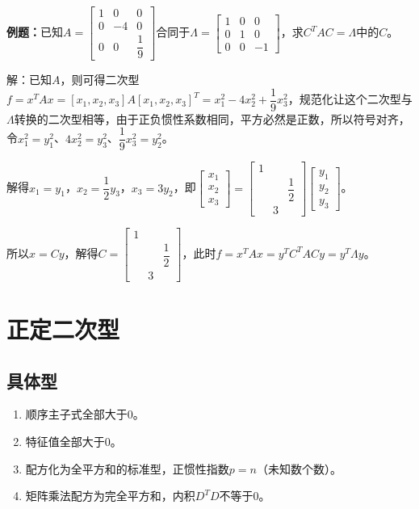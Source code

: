 \documentclass[UTF8, 12pt]{ctexart}
\begin{document}
\textbf{例题：}已知$A=\left[\begin{array}{ccc}
    1 & 0 & 0 \\
    0 & -4 & 0 \\
    0 & 0 & \dfrac{1}{9}
\end{array}\right]$合同于$\Lambda=\left[\begin{array}{ccc}
    1 & 0 & 0 \\
    0 & 1 & 0 \\
    0 & 0 & -1
\end{array}\right]$，求$C^TAC=\Lambda$中的$C$。

解：已知$A$，则可得二次型$f=x^TAx=[x_1,x_2,x_3]A[x_1,x_2,x_3]^T=x_1^2-4x_2^2+\dfrac{1}{9}x_3^2$，规范化让这个二次型与$\Lambda$转换的二次型相等，由于正负惯性系数相同，平方必然是正数，所以符号对齐，令$x_1^2=y_1^2$、$4x_2^2=y_3^2$、$\dfrac{1}{9}x_3^2=y_2^2$。

解得$x_1=y_1$，$x_2=\dfrac{1}{2}y_3$，$x_3=3y_2$，即$\left[\begin{array}{c}
    x_1 \\
    x_2 \\
    x_3
\end{array}\right]=\left[\begin{array}{ccc}
    1 \\
    & & \dfrac{1}{2} \\
    & 3
\end{array}\right]\left[\begin{array}{c}
    y_1 \\
    y_2 \\
    y_3
\end{array}\right]$。

所以$x=Cy$，解得$C=\left[\begin{array}{ccc}
    1 \\
    & & \dfrac{1}{2} \\
    & 3
\end{array}\right]$，此时$f=x^TAx=y^TC^TACy=y^T\Lambda y$。

\section{正定二次型}

\subsection{具体型}

\begin{enumerate}
    \item 顺序主子式全部大于0。
    \item 特征值全部大于0。
    \item 配方化为全平方和的标准型，正惯性指数$p=n$（未知数个数）。
    \item 矩阵乘法配方为完全平方和，内积$D^TD$不等于0。
\end{enumerate}
\end{document}
